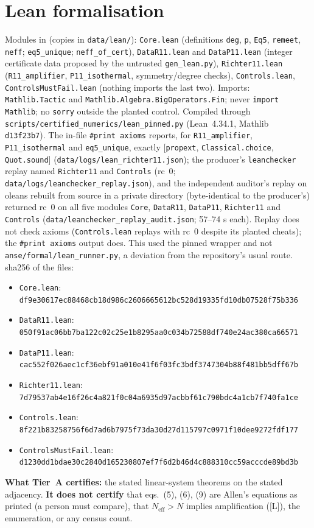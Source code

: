 \documentclass[10pt]{article}
\newcommand{\tier}[1]{\textsf{[#1]}}
\newcommand{\tL}{\tier{L}}
\newcommand{\lean}[1]{\texttt{#1}}
\newcommand{\Neff}{N_{\mathrm{eff}}}
\begin{document}
\section{Lean formalisation}\label{sec:lean}
Modules in  (copies in \texttt{data/lean/}): \texttt{Core.lean} (definitions \lean{deg}, \lean{p}, \lean{Eq5}, \lean{remeet}, \lean{neff}; \lean{eq5\_unique}; \lean{neff\_of\_cert}), \texttt{DataR11.lean} and \texttt{DataP11.lean}
(integer certificate data proposed by the untrusted \texttt{gen\_lean.py}), \texttt{Richter11.lean} (\lean{R11\_amplifier}, \lean{P11\_isothermal}, symmetry/degree checks), \texttt{Controls.lean}, \texttt{ControlsMustFail.lean} (nothing imports the last two). Imports: \lean{Mathlib.Tactic} and
\lean{Mathlib.Algebra.BigOperators.Fin}; never \lean{import Mathlib}; no \lean{sorry} outside the planted control. Compiled through \texttt{scripts/certified\_numerics/lean\_pinned.py} (Lean~4.34.1, Mathlib \texttt{d13f23b7}). The in-file \lean{\#print axioms} reports, for \lean{R11\_amplifier}, \lean{P11\_isothermal} and \lean{eq5\_unique},
exactly $[$\lean{propext}, \lean{Classical.choice}, \lean{Quot.sound}$]$ (\texttt{data/logs/lean\_richter11.json}); the producer's \texttt{leanchecker} replay named \lean{Richter11} and \lean{Controls} (rc~0; \texttt{data/logs/leanchecker\_replay.json}), and the independent auditor's replay on oleans rebuilt from source in a private directory (byte-identical to the producer's) returned rc~0 on all five modules \lean{Core}, \lean{DataR11}, \lean{DataP11}, \lean{Richter11} and \lean{Controls} (\texttt{data/leanchecker\_replay\_audit.json}; 57--74 s each). Replay does not check axioms (\texttt{Controls.lean} replays with rc~0 despite its planted cheats); the \lean{\#print axioms} output does.
This used the pinned wrapper and not \texttt{anse/formal/lean\_runner.py}, a deviation from the repository's usual route. sha256 of the files:
\begin{itemize}\scriptsize\itemsep=0pt
\item \texttt{Core.lean}: \texttt{df9e30617ec88468cb18d986c2606665612bc528d19335fd10db07528f75b336}
\item \texttt{DataR11.lean}: \texttt{050f91ac06bb7ba122c02c25e1b8295aa0c034b72588df740e24ac380ca66571}
\item \texttt{DataP11.lean}: \texttt{cac552f026aec1cf36ebf91a010e41f6f03fc3bdf3747304b88f481bb5dff67b}
\item \texttt{Richter11.lean}: \texttt{7d79537ab4e16f26c4a821f0c04a6935d97acbbf61c790bdc4a1cb7f740fa1ce}
\item \texttt{Controls.lean}: \texttt{8f221b83258756f6d7ad6b7975f73da30d27d115797c0971f10dee9272fdf177}
\item \texttt{ControlsMustFail.lean}: \texttt{d1230dd1bdae30c2840d165230807ef7f6d2b46d4c888310cc59acccde89bd3b}
\end{itemize}
\textbf{What Tier~A certifies:} the stated linear-system theorems on the stated adjacency. \textbf{It does not certify} that eqs.~(5), (6), (9) are Allen's equations as printed (a person must compare), that $\Neff>N$ implies amplification (\tL), the enumeration, or any census count.
\end{document}
